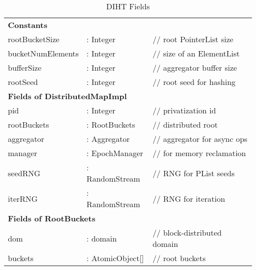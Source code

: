 \documentclass[letterpaper, 10 pt, conference]{ieeeconf}  %
\begin{document}

\begin{table}
    \centering
    \caption{DIHT Fields}
    \label{tab:map_struct}
    \begin{tabular}{l l l}
        \multicolumn{3}{l}{\textbf{Constants}} \\
        rootBucketSize & : Integer & // root PointerList size \\
        bucketNumElements & : Integer & // size of an ElementList \\
        bufferSize & : Integer & // aggregator buffer size \\
        rootSeed & : Integer & // root seed for hashing \\
        
        \multicolumn{3}{l}{\textbf{Fields of DistributedMapImpl}} \\
        pid & : Integer & // privatization id \\
        rootBuckets & : RootBuckets & // distributed root \\
        aggregator & : Aggregator & // aggregator for async ops \\
        manager & : EpochManager & // for memory reclamation \\
        seedRNG & : RandomStream & // RNG for PList seeds \\
        iterRNG & : RandomStream & // RNG for iteration \\
        
        \multicolumn{3}{l}{\textbf{Fields of RootBuckets}} \\
        dom & : domain & // block-distributed domain \\
        buckets & : AtomicObject[] & // root buckets \\
    \end{tabular}
\end{table}
\end{document}
